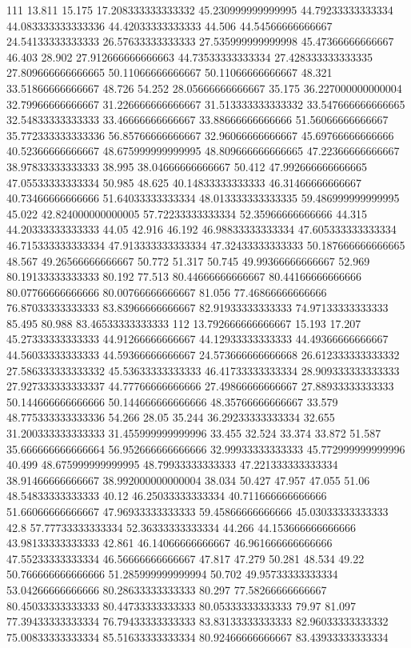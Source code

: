 111 13.811 15.175 17.208333333333332 45.230999999999995 44.79233333333334 44.083333333333336 44.42033333333333 44.506 44.54566666666667 24.54133333333333 26.57633333333333 27.535999999999998 45.47366666666667 46.403 28.902 27.912666666666663 44.73533333333334 27.428333333333335 27.809666666666665 50.11066666666667 50.11066666666667 48.321 33.51866666666667 48.726 54.252 28.05666666666667 35.175 36.227000000000004 32.79966666666667 31.226666666666667 31.513333333333332 33.547666666666665 32.54833333333333 33.46666666666667 33.88666666666666 51.56066666666667 35.772333333333336 56.85766666666667 32.96066666666667 45.69766666666666 40.52366666666667 48.675999999999995 48.809666666666665 47.22366666666667 38.97833333333333 38.995 38.04666666666667 50.412 47.992666666666665 47.05533333333334 50.985 48.625 40.14833333333333 46.31466666666667 40.73466666666666 51.64033333333334 48.013333333333335 59.486999999999995 45.022 42.824000000000005 57.72233333333334 52.35966666666666 44.315 44.20333333333333 44.05 42.916 46.192 46.98833333333334 47.605333333333334 46.715333333333334 47.913333333333334 47.32433333333333 50.187666666666665 48.567 49.26566666666667 50.772 51.317 50.745 49.99366666666667 52.969 80.19133333333333 80.192 77.513 80.44666666666667 80.44166666666666 80.07766666666666 80.00766666666667 81.056 77.46866666666666 76.87033333333333 83.83966666666667 82.91933333333333 74.97133333333333 85.495 80.988 83.46533333333333
112 13.792666666666667 15.193 17.207 45.27333333333333 44.91266666666667 44.12933333333333 44.49366666666667 44.56033333333333 44.59366666666667 24.573666666666668 26.612333333333332 27.586333333333332 45.53633333333333 46.41733333333334 28.909333333333333 27.927333333333337 44.77766666666666 27.49866666666667 27.88933333333333 50.144666666666666 50.144666666666666 48.35766666666667 33.579 48.775333333333336 54.266 28.05 35.244 36.29233333333334 32.655 31.200333333333333 31.455999999999996 33.455 32.524 33.374 33.872 51.587 35.666666666666664 56.952666666666666 32.99933333333333 45.772999999999996 40.499 48.675999999999995 48.79933333333333 47.221333333333334 38.91466666666667 38.992000000000004 38.034 50.427 47.957 47.055 51.06 48.54833333333333 40.12 46.25033333333334 40.711666666666666 51.66066666666667 47.96933333333333 59.45866666666666 45.03033333333333 42.8 57.77733333333334 52.36333333333334 44.266 44.153666666666666 43.98133333333333 42.861 46.14066666666667 46.961666666666666 47.55233333333334 46.56666666666667 47.817 47.279 50.281 48.534 49.22 50.766666666666666 51.285999999999994 50.702 49.95733333333334 53.04266666666666 80.28633333333333 80.297 77.58266666666667 80.45033333333333 80.44733333333333 80.05333333333333 79.97 81.097 77.39433333333334 76.79433333333333 83.83133333333333 82.96033333333332 75.00833333333334 85.51633333333334 80.92466666666667 83.43933333333334
